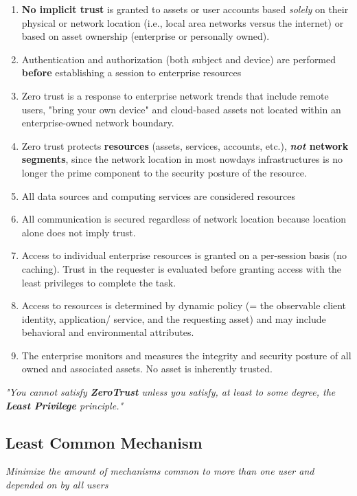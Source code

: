 \begin{enumerate}
   \item \textbf{No implicit trust} is granted to assets or user accounts based
   \textit{solely} on their physical or network location (i.e., local area networks versus the internet) or based on asset ownership
   (enterprise or personally owned).
   \item Authentication and authorization (both subject and device) are
   performed \textbf{before} establishing a session to enterprise resources
   \item Zero trust is a response to enterprise network trends that include remote users, "bring your own device" and cloud-based assets
   not located within an enterprise-owned network boundary.
   \item Zero trust protects \textbf{resources} (assets, services, accounts, etc.), \textbf{\textit{not} network segments},
   since the network location in most nowdays infrastructures is no longer the
   prime component to the security posture of the resource.

   \item All data sources and computing services are considered resources
   \item All communication is secured regardless of network location because
   location alone does not imply trust.
   \item Access to individual enterprise resources is granted on a per-session
   basis (no caching). Trust in the requester is evaluated before granting
   access with the least privileges to complete the task.
   \item Access to resources is determined by dynamic policy (= the
   observable client identity, application/ service, and the requesting
   asset) and may include behavioral and environmental attributes.
   \item The enterprise monitors and measures the integrity and security
   posture of all owned and associated assets. No asset is inherently
   trusted.
\end{enumerate}


\begin{center}
   \textit{"You cannot satisfy \textbf{ZeroTrust} unless you satisfy, at least to some degree, the \textbf{Least Privilege} principle."}
\end{center}

\subsection{Least Common Mechanism}
\begin{center}
   \textit{Minimize the amount of mechanisms common to more than
   one user and depended on by all users}
\end{center}


